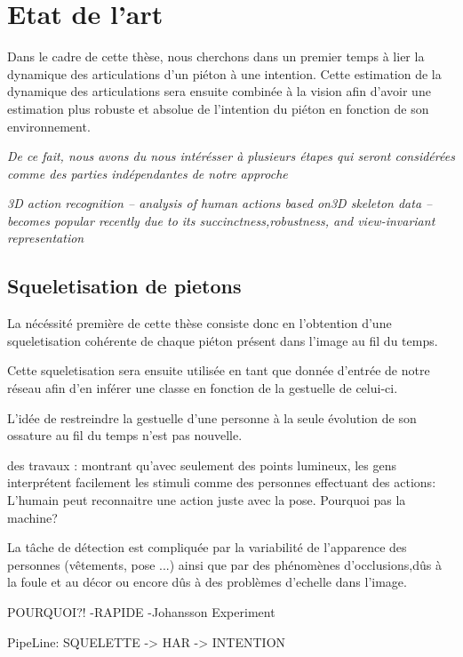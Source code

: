 \section{Etat de l'art}
\label{sec:SOTA}

Dans le cadre de cette thèse, nous cherchons dans un premier temps à lier la dynamique des articulations d'un piéton à une intention. Cette estimation de la dynamique des articulations sera ensuite combinée à la vision afin d’avoir une estimation plus robuste et absolue de l'intention du piéton en fonction de son environnement.

\textit{De ce fait, nous avons du nous intérésser à plusieurs étapes qui seront considérées comme des parties indépendantes de notre approche}

\textit{3D action recognition – analysis of human actions based on3D  skeleton  data  –  becomes  popular  recently  due  to  its  succinctness,robustness, and view-invariant representation}

\subsection{Squeletisation de pietons}
La nécéssité première de cette thèse consiste donc en l'obtention d'une squeletisation cohérente de chaque piéton présent dans l'image au fil du temps.

Cette squeletisation sera ensuite utilisée en tant que donnée d'entrée de notre réseau afin d'en inférer une classe en fonction de la gestuelle de celui-ci.

L'idée de restreindre la gestuelle d'une personne à la seule évolution de son ossature au fil du temps n'est pas nouvelle.

des travaux  \cite{johansson1973visual,johansson1976spatio}: montrant qu'avec seulement des points lumineux, les gens interprétent facilement les stimuli comme des personnes effectuant des actions: L'humain peut reconnaitre une action juste avec la pose. Pourquoi pas la machine?

La tâche de détection est compliquée par la variabilité de l’apparence des personnes (vêtements, pose ...)
ainsi que par des phénomènes d’occlusions,dûs à la foule et au décor ou encore dûs à des problèmes d'echelle dans l'image.





POURQUOI?!
-RAPIDE
-Johansson Experiment 

PipeLine: SQUELETTE -> HAR -> INTENTION

